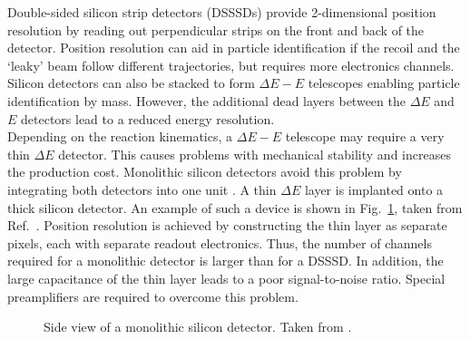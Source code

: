%
Double-sided silicon strip detectors (DSSSDs) provide 2-dimensional position resolution by reading out perpendicular strips on the front and back of the detector. Position resolution can aid in particle identification if the recoil and the `leaky' beam follow different trajectories, but requires more electronics channels. Silicon detectors can also be stacked to form $\Delta{}E-E$ telescopes enabling particle identification by mass. However, the additional dead layers between the $\Delta{}E$ and $E$ detectors lead to a reduced energy resolution.\\  
Depending on the reaction kinematics, a $\Delta{}E-E$ telescope may require a very thin $\Delta{}E$ detector. This causes problems with mechanical stability and increases the production cost. Monolithic silicon detectors avoid this problem by integrating both detectors into one unit \cite{card96}. A thin $\Delta{}E$ layer is implanted onto a thick silicon detector. An example of such a device is shown in Fig.\ \ref{fig:monolith}, taken from Ref.\ \cite{tudi99}. Position resolution is achieved by constructing the thin layer as separate pixels, each with separate readout electronics. Thus, the number of channels required for a monolithic detector is larger than for a DSSSD. In addition, the large capacitance of the thin layer leads to a poor signal-to-noise ratio. Special preamplifiers are required to overcome this problem.%
%
\begin{figure}
\centering
{}
\caption{Side view of a monolithic silicon detector. Taken from \cite{tudi99}.}
\label{fig:monolith}
\end{figure}
%

